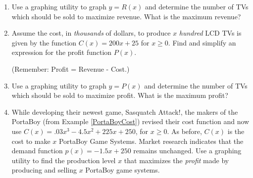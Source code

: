 \documentclass{ximera}
\begin{document}
\begin{enumerate}
\setcounter{enumi}{\value{HW}}

\item  Use a graphing utility to graph $y = R(x)$ and determine the number of TVs which should be sold to maximize revenue.  What is the maximum revenue? \label{lcdmaxprofitexerfirst}

\item Assume the cost, in \textit{thousands} of dollars, to produce $x$ \textit{hundred} LCD TVs is given by the function $C(x) = 200x + 25$ for $x \geq 0$. Find and simplify an expression for the profit function $P(x)$.  

(Remember: Profit = Revenue - Cost.)

\item  Use a graphing utility to graph $y = P(x)$ and determine the number of TVs which should be sold to maximize profit.  What is the maximum  profit? \label{lcdmaxprofitexerlast}

\item \label{newportaboycost} While developing their newest game, Sasquatch Attack!, the makers of the PortaBoy (from Example \ref{PortaBoyCost}) revised their cost function and now use $C(x) = .03x^{3} - 4.5x^{2} + 225x + 250$, for $x \geq 0$. As before, $C(x)$ is the cost to make $x$ PortaBoy Game Systems.  Market research indicates that the demand function $p(x) = -1.5x + 250$ remains unchanged.  Use a graphing utility to find the production level $x$ that maximizes the \textit{profit} made by producing and selling $x$ PortaBoy game systems.

\setcounter{HW}{\value{enumi}}
\end{enumerate}
\end{document}
